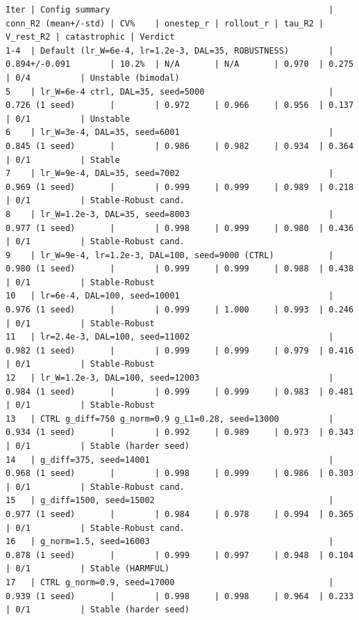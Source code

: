 \begin{tiny}
\begin{verbatim}
Iter | Config summary                                            | conn_R2 (mean+/-std) | CV%    | onestep_r | rollout_r | tau_R2 | V_rest_R2 | catastrophic | Verdict
1-4  | Default (lr_W=6e-4, lr=1.2e-3, DAL=35, ROBUSTNESS)        | 0.894+/-0.091        | 10.2%  | N/A       | N/A       | 0.970  | 0.275     | 0/4          | Unstable (bimodal)
5    | lr_W=6e-4 ctrl, DAL=35, seed=5000                         | 0.726 (1 seed)       |        | 0.972     | 0.966     | 0.956  | 0.137     | 0/1          | Unstable
6    | lr_W=3e-4, DAL=35, seed=6001                              | 0.845 (1 seed)       |        | 0.986     | 0.982     | 0.934  | 0.364     | 0/1          | Stable
7    | lr_W=9e-4, DAL=35, seed=7002                              | 0.969 (1 seed)       |        | 0.999     | 0.999     | 0.989  | 0.218     | 0/1          | Stable-Robust cand.
8    | lr_W=1.2e-3, DAL=35, seed=8003                            | 0.977 (1 seed)       |        | 0.998     | 0.999     | 0.980  | 0.436     | 0/1          | Stable-Robust cand.
9    | lr_W=9e-4, lr=1.2e-3, DAL=100, seed=9000 (CTRL)           | 0.980 (1 seed)       |        | 0.999     | 0.999     | 0.988  | 0.438     | 0/1          | Stable-Robust
10   | lr=6e-4, DAL=100, seed=10001                              | 0.976 (1 seed)       |        | 0.999     | 1.000     | 0.993  | 0.246     | 0/1          | Stable-Robust
11   | lr=2.4e-3, DAL=100, seed=11002                            | 0.982 (1 seed)       |        | 0.999     | 0.999     | 0.979  | 0.416     | 0/1          | Stable-Robust
12   | lr_W=1.2e-3, DAL=100, seed=12003                          | 0.984 (1 seed)       |        | 0.999     | 0.999     | 0.983  | 0.481     | 0/1          | Stable-Robust
13   | CTRL g_diff=750 g_norm=0.9 g_L1=0.28, seed=13000          | 0.934 (1 seed)       |        | 0.992     | 0.989     | 0.973  | 0.343     | 0/1          | Stable (harder seed)
14   | g_diff=375, seed=14001                                    | 0.968 (1 seed)       |        | 0.998     | 0.999     | 0.986  | 0.303     | 0/1          | Stable-Robust cand.
15   | g_diff=1500, seed=15002                                   | 0.977 (1 seed)       |        | 0.984     | 0.978     | 0.994  | 0.365     | 0/1          | Stable-Robust cand.
16   | g_norm=1.5, seed=16003                                    | 0.878 (1 seed)       |        | 0.999     | 0.997     | 0.948  | 0.104     | 0/1          | Stable (HARMFUL)
17   | CTRL g_norm=0.9, seed=17000                               | 0.939 (1 seed)       |        | 0.998     | 0.998     | 0.964  | 0.233     | 0/1          | Stable (harder seed)

\end{verbatim}
\end{tiny}
